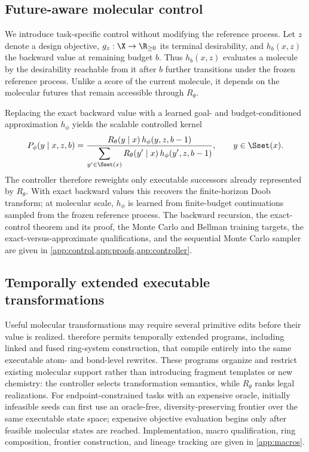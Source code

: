 \subsection{Future-aware molecular control}
\label{sec:gem-control}

We introduce task-specific control without modifying the reference process. Let $z$ denote a design objective, $g_z:\X\rightarrow\R_{\ge0}$ its terminal desirability, and $h_b(x,z)$ the backward value at remaining budget $b$. Thus $h_b(x,z)$ evaluates a molecule by the desirability reachable from it after $b$ further transitions under the frozen reference process. Unlike a score of the current molecule, it depends on the molecular futures that remain accessible through $R_\theta$.

Replacing the exact backward value with a learned goal- and budget-conditioned approximation $h_\phi$ yields the scalable controlled kernel
\begin{equation}
P_\phi(y\mid x,z,b)=\frac{R_\theta(y\mid x)\,h_\phi(y,z,b-1)}{\displaystyle\sum_{y'\in\Sset(x)}R_\theta(y'\mid x)\,h_\phi(y',z,b-1)},
\qquad y\in\Sset(x).
\label{eq:gem-central}
\end{equation}
The controller therefore reweights only executable successors already represented by $R_\theta$. With exact backward values this recovers the finite-horizon Doob transform; at molecular scale, $h_\phi$ is learned from finite-budget continuations sampled from the frozen reference process. The backward recursion, the exact-control theorem and its proof, the Monte Carlo and Bellman training targets, the exact-versus-approximate qualifications, and the sequential Monte Carlo sampler are given in \cref{app:control,app:proofs,app:controller}.

\subsection{Temporally extended executable transformations}
\label{sec:gem-macros}

Useful molecular transformations may require several primitive edits before their value is realized. \method{} therefore permits temporally extended programs, including linked and fused ring-system construction, that compile entirely into the same executable atom- and bond-level rewrites. These programs organize and restrict existing molecular support rather than introducing fragment templates or new chemistry: the controller selects transformation semantics, while $R_\theta$ ranks legal realizations. For endpoint-constrained tasks with an expensive oracle, initially infeasible seeds can first use an oracle-free, diversity-preserving frontier over the same executable state space; expensive objective evaluation begins only after feasible molecular states are reached. Implementation, macro qualification, ring composition, frontier construction, and lineage tracking are given in \cref{app:macros}.
